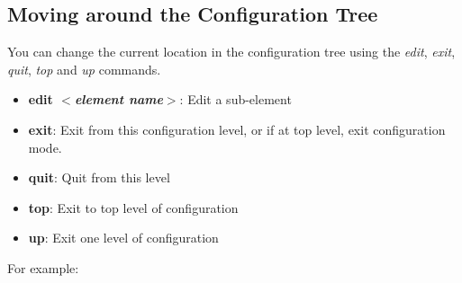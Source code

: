 \newpage
\subsection{Moving around the Configuration Tree}
You can change the current location in the configuration tree using
the \emph{edit}, \emph{exit}, \emph{quit}, \emph{top} and \emph{up} commands.
\begin{itemize}
\item \textbf{edit $<$\textit{element name}$>$}:       Edit a sub-element
\item \textbf{exit}:       Exit from this configuration level, or if
at top level, exit configuration mode.
\item \textbf{quit}:       Quit from this level
\item \textbf{top}:        Exit to top level of configuration
\item \textbf{up}:         Exit one level of configuration
\end{itemize}

\noindent
For example:
\vspace{0.1in}

\noindent{}

